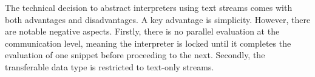 \documentclass[a4paper,12pt,twocolumn]{article}
\begin{document}
\begin{comment}

Lets write the "Discussion" section. of the paper. Please check the grammar of
the following points and make a linked narrative out of them. Please use Latex
markup.

---

The technical decision to abstract interpreters using text streams has its
positive and negative sides. While simplicity is the obvious bonus, the negatvie
consequences can be groouped into (1) No parallel evaluation at the
communication level. Th interpreter gets locked until it finishes evaluation of
one snippet before it can proceed to another one. (2) Transferrable data type is
limited to text-only streams.

We argue that the lack of parallel execution at the communication level can be
compensated by using interpreter-specific parallelism where and if it is
supported. For example, Python programs can use all sort of subprocess
utilities while shell programs have full access to shell job control.

Restricting streams to text-only data type seems to be a more funcdamental
limitation. Litrepl lifts this limitation by supporting text-only document
formats. Both Latex and Markdown have means of including rich data but they
don't encode these data directly. Instead they rely on side channels: file
system or network for referring such objects. Litrepl shares both pros such as
good representation in well-known version control systems, and cons, e.g.
requirement to organize such a side-channel data transfer explicitly.

Another controversial technical solution - to transfer the whole document at
input and output - can have performance penalties. In our experience the system
works sufficienlty good for few-thousand line documents, but for larger
documents delays might become uncomfortable even on modern computers. Still we
prefer to keep this interface to make editor integration as simple as possible:
typical plugin can just pipe the whole document through the tool using few lines
of code.

In addition, we allow a more performant integrations which take responsibility
for pre-parsing and piping only the relevant parts of the document. For these
approach, Litrepl offers \verb|print-regexp| command printing the anchor regexp
in a few common formats.
\end{comment}

The technical decision to abstract interpreters using text streams comes with
both advantages and disadvantages. A key advantage is simplicity. However, there
are notable negative aspects. Firstly, there is no parallel evaluation at the
communication level, meaning the interpreter is locked until it completes the
evaluation of one snippet before proceeding to the next. Secondly, the
transferable data type is restricted to text-only streams.
\end{document}
